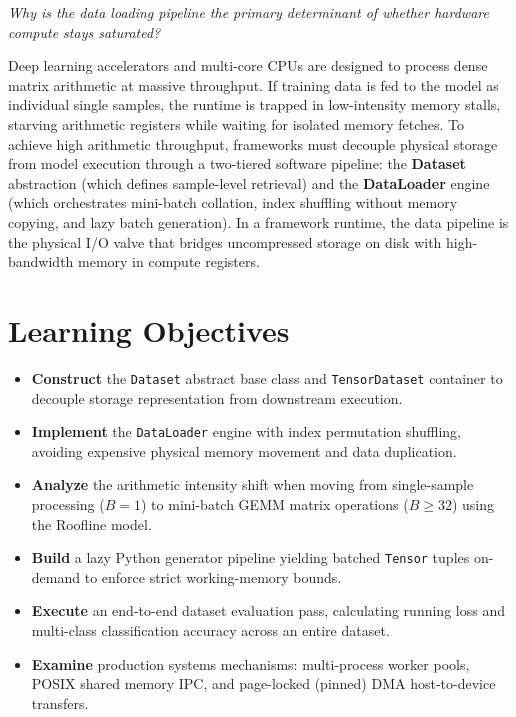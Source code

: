 \documentclass[
  letterpaper,
]{scrbook}
\providecommand{\tightlist}{%
  \setlength{\itemsep}{0pt}\setlength{\parskip}{0pt}}
\begin{document}

\emph{Why is the data loading pipeline the primary determinant of
whether hardware compute stays saturated?}

Deep learning accelerators and multi-core CPUs are designed to process
dense matrix arithmetic at massive throughput. If training data is fed
to the model as individual single samples, the runtime is trapped in
low-intensity memory stalls, starving arithmetic registers while waiting
for isolated memory fetches. To achieve high arithmetic throughput,
frameworks must decouple physical storage from model execution through a
two-tiered software pipeline: the \textbf{Dataset} abstraction (which
defines sample-level retrieval) and the \textbf{DataLoader} engine
(which orchestrates mini-batch collation, index shuffling without memory
copying, and lazy batch generation). In a framework runtime, the data
pipeline is the physical I/O valve that bridges uncompressed storage on
disk with high-bandwidth memory in compute registers.

\section{Learning Objectives}\label{learning-objectives-5}

\begin{itemize}
\tightlist
\item
  \textbf{Construct} the \texttt{Dataset} abstract base class and
  \texttt{TensorDataset} container to decouple storage representation
  from downstream execution.
\item
  \textbf{Implement} the \texttt{DataLoader} engine with index
  permutation shuffling, avoiding expensive physical memory movement and
  data duplication.
\item
  \textbf{Analyze} the arithmetic intensity shift when moving from
  single-sample processing (\(B = 1\)) to mini-batch GEMM matrix
  operations (\(B \ge 32\)) using the Roofline model.
\item
  \textbf{Build} a lazy Python generator pipeline yielding batched
  \texttt{Tensor} tuples on-demand to enforce strict working-memory
  bounds.
\item
  \textbf{Execute} an end-to-end dataset evaluation pass, calculating
  running loss and multi-class classification accuracy across an entire
  dataset.
\item
  \textbf{Examine} production systems mechanisms: multi-process worker
  pools, POSIX shared memory IPC, and page-locked (pinned) DMA
  host-to-device transfers.
\end{itemize}
\end{document}
